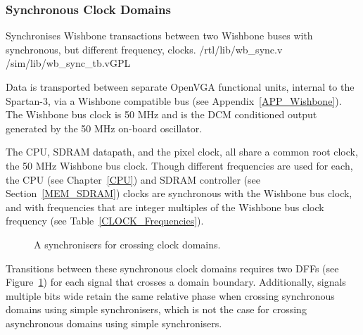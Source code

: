 \subsubsection{Synchronous Clock Domains}
\label{CLOCK_Sync}

{Synchronises Wishbone transactions between two Wishbone buses with synchronous,
but different frequency, clocks.} {/rtl/lib/wb\_sync.v}
{/sim/lib/wb\_sync\_tb.v}{GPL}

Data is transported between separate OpenVGA functional units, internal to the
Spartan-3, via a Wishbone compatible bus (see Appendix~\ref{APP_Wishbone}). The
Wishbone bus clock is 50 MHz and is the DCM conditioned output generated by the
50 MHz on-board oscillator.

The CPU, SDRAM datapath, and the pixel clock, all share a common
root clock, the 50 MHz Wishbone bus clock. Though different frequencies are
used for each, the CPU (see Chapter~\ref{CPU}) and SDRAM controller (see
Section~\ref{MEM_SDRAM}) clocks are synchronous with the Wishbone bus clock,
and with frequencies that are integer multiples of the Wishbone bus clock
frequency (see Table~\ref{CLOCK_Frequencies}).

\begin{figure}[h!]
\begin{center}
\end{center}

\caption[Single-bit synchronisers]{A synchronisers for crossing clock domains.}
\label{CLOCK_Synchro}
\end{figure}

Transitions between these synchronous clock domains requires two DFFs (see
Figure~\ref{CLOCK_Synchro}) for each signal that crosses a domain boundary.
Additionally, signals multiple bits wide retain the same relative phase when
crossing synchronous domains using simple synchronisers, which is not the case
for crossing asynchronous domains using simple synchronisers\cite{Async_FIFO}.


